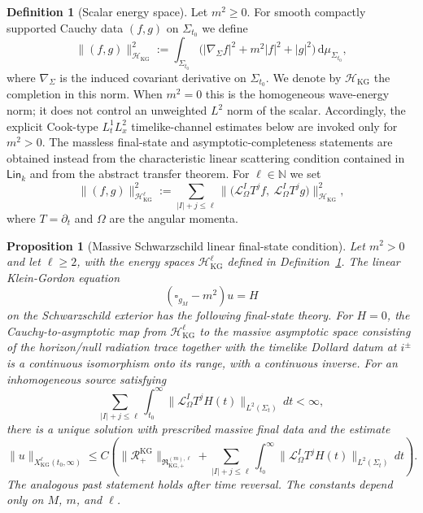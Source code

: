 \documentclass[11pt]{article}
\numberwithin{equation}{section}
\theoremstyle{plain}
\newtheorem{proposition}[theorem]{Proposition}
\theoremstyle{definition}
\newtheorem{definition}{Definition}[section]
\theoremstyle{remark}
\newcommand{\dd}{\mathrm{d}}
\newcommand{\Lin}{\mathsf{Lin}}
\begin{document}
\begin{definition}[Scalar energy space]\label{def:kg-energy}
Let $m^{2}\ge 0$.
For smooth compactly supported Cauchy data $(f,g)$ on $\Sigma_{t_0}$ we define
\begin{equation}\label{eq:kg-energy-norm}
\|(f,g)\|_{\mathcal H_{\mathrm{KG}}}^{2}
:=
\int_{\Sigma_{t_0}}
\bigl(|\nabla_{\Sigma} f|^{2}+m^{2}|f|^{2}+|g|^{2}\bigr)\,\dd\mu_{\Sigma_{t_0}},
\end{equation}
where $\nabla_{\Sigma}$ is the induced covariant derivative on $\Sigma_{t_0}$.
We denote by $\mathcal H_{\mathrm{KG}}$ the completion in this norm.
When $m^{2}=0$ this is the homogeneous wave-energy norm; it does not control an unweighted $L^{2}$ norm of the scalar.  Accordingly, the explicit Cook-type $L^{1}_{t}L^{2}_{x}$ timelike-channel estimates below are invoked only for $m^{2}>0$.  The massless final-state and asymptotic-completeness statements are obtained instead from the characteristic linear scattering condition contained in $\Lin_{k}$ and from the abstract transfer theorem.
For $\ell\in\mathbb N$ we set
\begin{equation}\label{eq:kg-energy-norm-high}
\|(f,g)\|_{\mathcal H_{\mathrm{KG}}^{\ell}}^{2}
:=
\sum_{|I|+j\le \ell}\bigl\|\bigl(\mathcal L_{\Omega}^{I}T^{j} f,\ \mathcal L_{\Omega}^{I}T^{j} g\bigr)\bigr\|_{\mathcal H_{\mathrm{KG}}}^{2},
\end{equation}
where $T=\partial_t$ and $\Omega$ are the angular momenta.
\end{definition}


\begin{proposition}[Massive Schwarzschild linear final-state condition]\label{prop:massive-schwarzschild-linear-final-state}
Let $m^2>0$ and let $\ell\ge2$, with the energy spaces $\mathcal H_{\mathrm{KG}}^\ell$ defined in Definition~\ref{def:kg-energy}.  The linear Klein-Gordon equation
\begin{equation}
 (\square_{g_M}-m^2)u=H
\end{equation}
on the Schwarzschild exterior has the following final-state theory.  For $H=0$, the Cauchy-to-asymptotic map from $\mathcal H_{\mathrm{KG}}^\ell$ to the massive asymptotic space consisting of the horizon/null radiation trace together with the timelike Dollard datum at $i^\pm$ is a continuous isomorphism onto its range, with a continuous inverse.  For an inhomogeneous source satisfying
\begin{equation}
 \sum_{|I|+j\le \ell}\int_{t_0}^{\infty}\|\mathcal L_\Omega^I T^jH(t)\|_{L^2(\Sigma_t)}\,dt<\infty,
\end{equation}
there is a unique solution with prescribed massive final data and the estimate
\begin{equation}\label{eq:massive-schwarzschild-linear-finalstate-estimate}
 \|u\|_{X_{\mathrm{KG}}^\ell(t_0,\infty)}
 \le C\left(\|\mathcal R_+^{\mathrm{KG}}\|_{\mathfrak R_{\mathrm{KG},+}^{(m),\ell}}
 +\sum_{|I|+j\le \ell}\int_{t_0}^{\infty}\|\mathcal L_\Omega^I T^jH(t)\|_{L^2(\Sigma_t)}\,dt\right).
\end{equation}
The analogous past statement holds after time reversal.  The constants depend only on $M$, $m$, and $\ell$.
\end{proposition}
\end{document}

